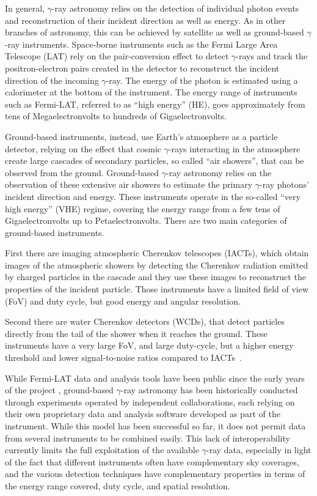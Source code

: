 \documentclass[longauth]{aa}
\newcommand{\fermi}{Fermi-LAT\xspace}
\newcommand{\gammaray}{$\gamma$-ray\xspace}
\newcommand{\gammarays}{$\gamma$-rays\xspace}
\begin{document}
In general, \gammaray astronomy relies on the detection of individual 
photon events and reconstruction of their incident direction as well
as energy. As in other branches of astronomy, this can be
achieved by satellite as well as ground-based \gammaray instruments.
Space-borne instruments such as the Fermi Large Area Telescope (LAT)
rely on the pair-conversion effect to detect \gammarays and track
the positron-electron pairs created in the detector to reconstruct the incident direction 
of the incoming \gammaray. The energy of the photon is estimated using a calorimeter
at the bottom of the instrument. The energy range of instruments such as \fermi \citep{Atwood2009}, referred to as
\enquote{high energy} (HE), goes approximately from tens of Megaelectronvolts to hundreds of Gigaelectronvolts. 

Ground-based instruments, instead, use Earth's atmosphere as a particle detector, relying on the effect that
cosmic \gammarays interacting in the atmosphere create large cascades of secondary particles, so called \enquote{air showers}, that can be observed from the ground.
Ground-based \gammaray astronomy relies on the observation of these extensive air showers to estimate the
primary \gammaray photons' incident direction and energy.
These instruments operate in the so-called \enquote{very high energy} (VHE) regime,
covering the energy range from a few tens of Gigaelectronvolts up to Petaelectronvolts.
There are two main categories of ground-based instruments.

First there are imaging atmospheric Cherenkov telescopes (IACTs), which obtain images of the atmospheric showers
by detecting the Cherenkov radiation emitted by charged particles in the cascade and
they use these images to reconstruct the properties of the incident particle.
Those instruments have a limited field of view (FoV) and duty cycle, but
good energy and angular resolution.
        
Second there are water Cherenkov detectors (WCDs), that detect particles directly from the tail of the
shower when it reaches the ground. These instruments have a very
large FoV, and large duty-cycle, but a higher energy threshold and
lower signal-to-noise ratios compared to IACTs~\citep{2015CRPhy..16..610D}.


While \fermi data and analysis tools have been public since the early years
of the project \citep{Atwood2009}, ground-based \gammaray astronomy has been historically conducted
through experiments operated by independent collaborations, each relying
on their own proprietary data and analysis software developed as part of the
instrument. While this model has been successful so far, it does not
permit data from several instruments to be combined easily. This lack of
interoperability currently limits the full exploitation of the
available \gammaray data, especially in light of the fact that different instruments often have
complementary sky coverages, and the various detection
techniques have complementary properties in terms of the energy range covered,
duty cycle, and spatial resolution.
\end{document}
